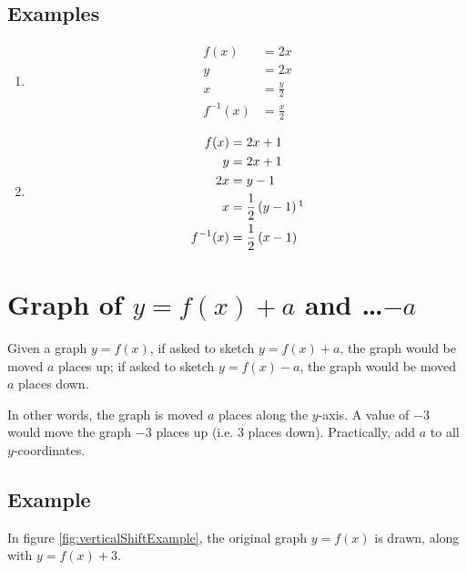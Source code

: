 \subsection{Examples}
\begin{enumerate}
	\item
	\begin{align*}
		f(x)&=2x\\
		y&=2x\\
		x&=\frac{y}{2}\\
		f^{-1}(x)&=\frac{x}{2}
	\end{align*}
	\item
	\begin{align*}
		f(x)&=2x+1\\
		y&=2x+1\\
		2x&=y-1\\
		x&=\frac{1}{2}\left(y-1\right)\footnotemark\\
		f^{-1}(x)&=\frac{1}{2}\left(x-1\right)
	\end{align*}
\end{enumerate}


\section{Graph of $y=f(x)+a$ and \dots$-a$}
Given a graph $y=f(x)$, if asked to sketch $y=f(x)+a$, the graph would be moved $a$ places up; if asked to sketch $y=f(x)-a$, the graph would be moved $a$ places down.

In other words, the graph is moved $a$ places along the $y$-axis. A value of $-3$ would move the graph $-3$ places up (i.e. $3$ places down). Practically, add $a$ to all $y$-coordinates.

\subsection{Example}
In figure \ref{fig:verticalShiftExample}, the original graph $y=f(x)$ is drawn, along with $y=f(x)+3$.


